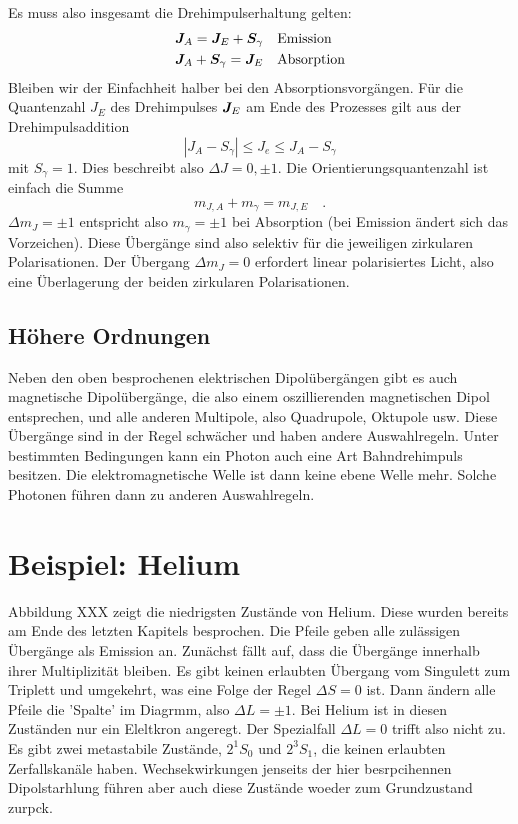 Es muss also insgesamt die Drehimpulserhaltung gelten:
\begin{align}
    \boldsymbol{J}_A = \boldsymbol{J}_E + \boldsymbol{S}_\gamma  & \quad \text{Emission} \\
    \boldsymbol{J}_A + \boldsymbol{S}_\gamma = \boldsymbol{J}_E & \quad \text{Absorption}
\end{align}
Bleiben wir der Einfachheit halber bei den Absorptionsvorgängen. Für die Quantenzahl $J_E$ des Drehimpulses $\boldsymbol{J}_E$ am Ende des Prozesses gilt aus der Drehimpulsaddition
\begin{equation}
    | J_A - S_\gamma | \le J_e \le J_A - S_\gamma
\end{equation}
mit $S_\gamma = 1$. Dies beschreibt also $\Delta J = 0, \pm 1$. Die Orientierungsquantenzahl ist einfach die Summe
\begin{equation}
    m_{J,A} + m_\gamma = m_{J,E} \quad .
\end{equation} 
$\Delta m_J = \pm 1$ entspricht also $ m_\gamma = \pm 1$ bei Absorption (bei Emission ändert sich das Vorzeichen). Diese Übergänge sind also selektiv für die jeweiligen zirkularen Polarisationen. Der Übergang $\Delta m_J = 0$ erfordert linear polarisiertes Licht, also eine Überlagerung der beiden zirkularen Polarisationen.


\subsection{Höhere Ordnungen}


Neben den oben besprochenen elektrischen Dipolübergängen gibt es auch magnetische Dipolübergänge, die also einem oszillierenden magnetischen Dipol entsprechen, und alle anderen Multipole, also Quadrupole, Oktupole usw. Diese Übergänge sind in der Regel schwächer und haben andere Auswahlregeln. Unter bestimmten Bedingungen kann ein Photon auch eine Art Bahndrehimpuls besitzen. Die elektromagnetische Welle ist dann keine ebene Welle mehr. Solche Photonen führen dann zu  anderen Auswahlregeln.



\section{Beispiel: Helium}

Abbildung XXX zeigt die niedrigsten Zustände von Helium. Diese wurden bereits am Ende des letzten Kapitels besprochen. Die Pfeile geben alle zulässigen Übergänge als Emission an. Zunächst fällt auf, dass die Übergänge innerhalb ihrer Multiplizität bleiben. Es gibt keinen erlaubten Übergang vom Singulett zum Triplett und umgekehrt, was eine Folge der Regel $\Delta S = 0$ ist. Dann ändern alle Pfeile die 'Spalte' im Diagrmm, also $\Delta L = \pm 1$. Bei Helium ist in diesen Zuständen nur ein Eleltkron angeregt. Der Spezialfall $\Delta L = 0$ trifft also nicht zu. Es gibt zwei metastabile Zustände, $2^1S_0$ und $2^3S_1$, die keinen erlaubten Zerfallskanäle haben. Wechsekwirkungen jenseits der hier besrpcihennen Dipolstarhlung führen aber auch diese Zustände woeder zum Grundzustand zurpck.


